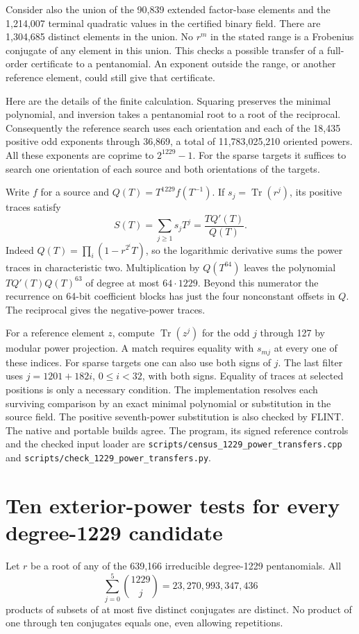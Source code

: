 \documentclass[11pt]{article}
\begin{document}
Consider also the union of the 90,839 extended factor-base elements and
the 1,214,007 terminal quadratic values in the certified binary field.
There are 1,304,685 distinct elements in the union. No \(r^m\) in the
stated range is a Frobenius conjugate of any element in this union.
This checks a possible transfer of a full-order certificate to a
pentanomial. An exponent outside the range, or another reference
element, could still give that certificate.

Here are the details of the finite calculation. Squaring preserves the
minimal polynomial, and inversion takes a pentanomial root to a root of
the reciprocal. Consequently the reference search uses each orientation
and each of the 18,435 positive odd exponents through 36,869, a total of
11,783,025,210 oriented powers. All these exponents are coprime to
\(2^{1229}-1\). For the sparse targets it suffices to search one
orientation of each source and both orientations of the targets.

Write \(f\) for a source and \(Q(T)=T^{1229}f(T^{-1})\). If
\(s_j=\operatorname{Tr}(r^j)\), its positive traces satisfy
\[
  S(T)=\sum_{j\ge1}s_jT^j=\frac{TQ'(T)}{Q(T)} .
\]
Indeed \(Q(T)=\prod_i(1-r^{2^i}T)\), so the logarithmic derivative
sums the power traces in characteristic two. Multiplication by
\(Q(T^{64})\) leaves the polynomial \(TQ'(T)Q(T)^{63}\) of degree
at most \(64\cdot1229\). Beyond this numerator the recurrence on
64-bit coefficient blocks has just the four nonconstant offsets
in \(Q\). The reciprocal gives the negative-power traces.

For a reference element \(z\), compute \(\operatorname{Tr}(z^j)\) for
the odd \(j\) through 127 by modular power projection. A match requires
equality with \(s_{mj}\) at every one of these indices. For sparse
targets one can also use both signs of \(j\). The last filter uses
\(j=1201+182i\), \(0\le i<32\), with both signs. Equality of traces
at selected positions is only a necessary condition. The implementation
resolves each surviving comparison by an exact minimal polynomial or
substitution in the source field. The positive seventh-power substitution
is also checked by FLINT. The native and portable builds agree.
The program, its signed reference controls and the checked input loader
are \nolinkurl{scripts/census_1229_power_transfers.cpp} and
\nolinkurl{scripts/check_1229_power_transfers.py}.

\section{Ten exterior-power tests for every degree-1229 candidate}
\label{sec:1229-ten-products}
Let \(r\) be a root of any of the 639,166 irreducible degree-1229
pentanomials. All
\[
              \sum_{j=0}^5 {1229\choose j}=23{,}270{,}993{,}347{,}436
\]
products of subsets of at most five distinct conjugates are distinct.
No product of one through ten conjugates equals one, even allowing
repetitions.
\end{document}

